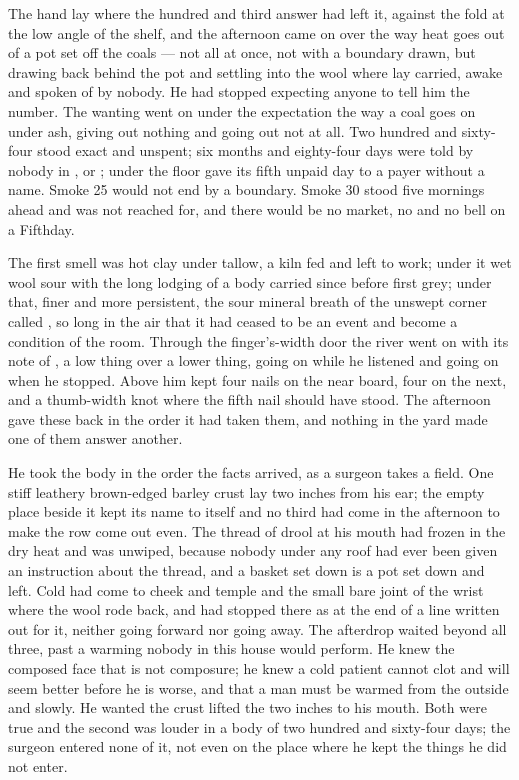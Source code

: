 The hand lay where the hundred and third answer had left it, against the fold at the low angle of the shelf, and the afternoon came on over  the way heat goes out of a pot set off the coals --- not all at once, not with a boundary drawn, but drawing back behind the pot and settling into the wool where  lay carried, awake and spoken of by nobody. He had stopped expecting anyone to tell him the number. The wanting went on under the expectation the way a coal goes on under ash, giving out nothing and going out not at all. Two hundred and sixty-four stood exact and unspent; six months and eighty-four days were told by nobody in ,  or ; under the floor  gave its fifth unpaid day to a payer without a name. Smoke 25 would not end by a boundary. Smoke 30 stood five mornings ahead and was not reached for, and there would be no market, no  and no bell on a Fifthday.

The first smell was hot clay under tallow, a kiln fed and left to work; under it wet wool sour with the long lodging of a body carried since before first grey; under that, finer and more persistent, the sour mineral breath of the unswept corner called ,  so long in the air that it had ceased to be an event and become a condition of the room. Through the finger's-width door the river went on with its note of , a low thing over a lower thing, going on while he listened and going on when he stopped. Above him  kept four nails on the near board, four on the next, and a thumb-width knot where the fifth nail should have stood. The afternoon gave these back in the order it had taken them, and nothing in the yard made one of them answer another.

He took the body in the order the facts arrived, as a surgeon takes a field. One stiff leathery brown-edged barley crust lay two inches from his ear; the empty place beside it kept its name to itself and no third had come in the afternoon to make the row come out even. The thread of drool at his mouth had frozen in the dry heat and was unwiped, because nobody under any roof had ever been given an instruction about the thread, and a basket set down is a pot set down and left. Cold had come to cheek and temple and the small bare joint of the wrist where the wool rode back, and had stopped there as at the end of a line written out for it, neither going forward nor going away. The afterdrop waited beyond all three, past a warming nobody in this house would perform. He knew the composed face that is not composure; he knew a cold patient cannot clot and will seem better before he is worse, and that a man must be warmed from the outside and slowly. He wanted the crust lifted the two inches to his mouth. Both were true and the second was louder in a body of two hundred and sixty-four days; the surgeon entered none of it, not even on the place where he kept the things he did not enter.

